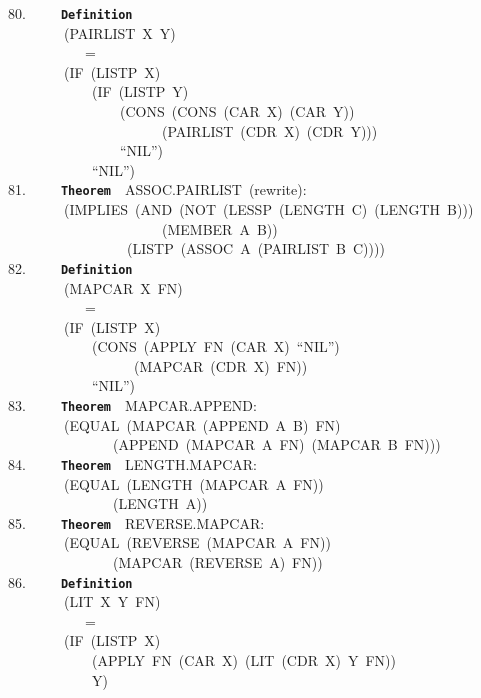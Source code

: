 \documentclass[11pt]{book}
\newenvironment{pubasis}{\begin{flushleft}\ttfamily\small}{\normalsize\rmfamily\end{flushleft}}
\newcommand{\axiomordefinition}[1]{\vspace{6pt}\texttt{\textbf{#1}}}
\begin{document}
\begin{pubasis}
80.~~~~~\axiomordefinition{Definition}\\
~~~~~~~~(PAIRLIST~X~Y)\\
~~~~~~~~~~~=\\
~~~~~~~~(IF~(LISTP~X)\\
~~~~~~~~~~~~(IF~(LISTP~Y)\\
~~~~~~~~~~~~~~~~(CONS~(CONS~(CAR~X)~(CAR~Y))\\
~~~~~~~~~~~~~~~~~~~~~~(PAIRLIST~(CDR~X)~(CDR~Y)))\\
~~~~~~~~~~~~~~~~``NIL'')\\
~~~~~~~~~~~~``NIL'')\\

81.~~~~~\axiomordefinition{Theorem}~~ASSOC.PAIRLIST~(rewrite):\\
~~~~~~~~(IMPLIES~(AND~(NOT~(LESSP~(LENGTH~C)~(LENGTH~B)))\\
~~~~~~~~~~~~~~~~~~~~~~(MEMBER~A~B))\\
~~~~~~~~~~~~~~~~~(LISTP~(ASSOC~A~(PAIRLIST~B~C))))\\

82.~~~~~\axiomordefinition{Definition}\\
~~~~~~~~(MAPCAR~X~FN)\\
~~~~~~~~~~~=\\
~~~~~~~~(IF~(LISTP~X)\\
~~~~~~~~~~~~(CONS~(APPLY~FN~(CAR~X)~``NIL'')\\
~~~~~~~~~~~~~~~~~~(MAPCAR~(CDR~X)~FN))\\
~~~~~~~~~~~~``NIL'')\\

83.~~~~~\axiomordefinition{Theorem}~~MAPCAR.APPEND:\\
~~~~~~~~(EQUAL~(MAPCAR~(APPEND~A~B)~FN)\\
~~~~~~~~~~~~~~~(APPEND~(MAPCAR~A~FN)~(MAPCAR~B~FN)))\\

84.~~~~~\axiomordefinition{Theorem}~~LENGTH.MAPCAR:\\
~~~~~~~~(EQUAL~(LENGTH~(MAPCAR~A~FN))\\
~~~~~~~~~~~~~~~(LENGTH~A))\\

85.~~~~~\axiomordefinition{Theorem}~~REVERSE.MAPCAR:\\
~~~~~~~~(EQUAL~(REVERSE~(MAPCAR~A~FN))\\
~~~~~~~~~~~~~~~(MAPCAR~(REVERSE~A)~FN))\\

86.~~~~~\axiomordefinition{Definition}\\
~~~~~~~~(LIT~X~Y~FN)\\
~~~~~~~~~~~=\\
~~~~~~~~(IF~(LISTP~X)\\
~~~~~~~~~~~~(APPLY~FN~(CAR~X)~(LIT~(CDR~X)~Y~FN))\\
~~~~~~~~~~~~Y)\\


\end{pubasis}
\end{document}
